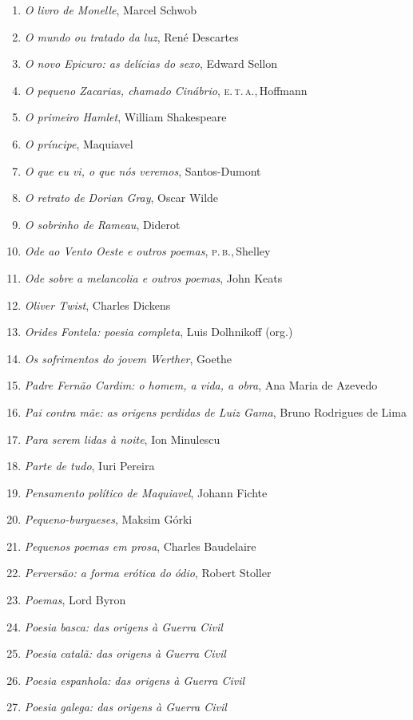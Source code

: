\begin{enumerate}
\item \textit{O livro de Monelle}, Marcel Schwob
\item \textit{O mundo ou tratado da luz}, René Descartes
\item \textit{O novo Epicuro: as delícias do sexo}, Edward Sellon
\item \textit{O pequeno Zacarias, chamado Cinábrio}, \textsc{e.\,t.\,a.},\,Hoffmann
\item \textit{O primeiro Hamlet}, William Shakespeare
\item \textit{O príncipe}, Maquiavel
\item \textit{O que eu vi, o que nós veremos}, Santos-Dumont
\item \textit{O retrato de Dorian Gray}, Oscar Wilde
\item \textit{O sobrinho de Rameau}, Diderot
\item \textit{Ode ao Vento Oeste e outros poemas}, \textsc{p.\,b.},\,Shelley
\item \textit{Ode sobre a melancolia e outros poemas}, John Keats
\item \textit{Oliver Twist}, Charles Dickens
\item \textit{Orides Fontela: poesia completa}, Luis Dolhnikoff (org.)
\item \textit{Os sofrimentos do jovem Werther}, Goethe
\item \textit{Padre Fernão Cardim: o homem, a vida, a obra}, Ana Maria de Azevedo
\item \textit{Pai contra mãe: as origens perdidas de Luiz Gama}, Bruno Rodrigues de Lima
\item \textit{Para serem lidas à noite}, Ion Minulescu
\item \textit{Parte de tudo}, Iuri Pereira
\item \textit{Pensamento político de Maquiavel}, Johann Fichte
\item \textit{Pequeno-burgueses}, Maksim Górki
\item \textit{Pequenos poemas em prosa}, Charles Baudelaire
\item \textit{Perversão: a forma erótica do ódio}, Robert Stoller
\item \textit{Poemas}, Lord Byron
\item \textit{Poesia basca: das origens à Guerra Civil} 
\item \textit{Poesia catalã: das origens à Guerra Civil} 
\item \textit{Poesia espanhola: das origens à Guerra Civil} 
\item \textit{Poesia galega: das origens à Guerra Civil} 

\end{enumerate}

